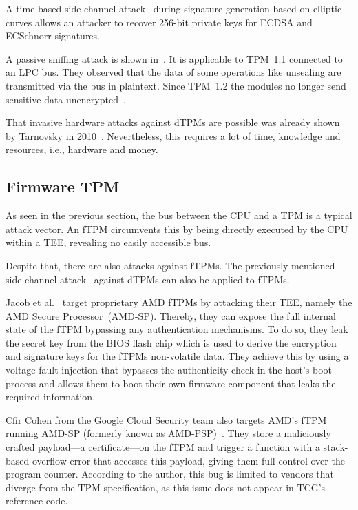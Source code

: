 A time-based side-channel attack~\cite{Moghimi2019} during signature generation based on elliptic curves allows an attacker to recover 256-bit private keys for ECDSA and ECSchnorr signatures.

A passive sniffing attack is shown in~\cite{Kursawe2005AnalyzingTP}.
It is applicable to TPM~1.1 connected to an LPC bus.
They observed that the data of some operations like unsealing are transmitted via the bus in plaintext.
Since TPM~1.2 the modules no longer send sensitive data unencrypted~\cite{Winter2013}.

That invasive hardware attacks against \acp{dTPM} are possible was already shown by Tarnovsky in 2010~\cite{tarnovsky}.
Nevertheless, this requires a lot of time, knowledge and resources, i.e., hardware and money.

\subsection{Firmware TPM}

As seen in the previous section, the bus between the CPU and a TPM is a typical attack vector.
An \ac{fTPM} circumvents this by being directly executed by the CPU within a \ac{TEE}, revealing no easily accessible bus.

Despite that, there are also attacks against \acp{fTPM}.
The previously mentioned side-channel attack~\cite{Moghimi2019} against \acp{dTPM} can also be applied to \acp{fTPM}.

Jacob et al.~\cite{Jacob2023} target proprietary AMD fTPMs by attacking their \ac{TEE}, namely the AMD Secure Processor~(AMD-SP).
Thereby, they can expose the full internal state of the \ac{fTPM} bypassing any authentication mechanisms.
To do so, they leak the secret key from the BIOS flash chip which is used to derive the encryption and signature keys for the \acp{fTPM} non-volatile data.
They achieve this by using a voltage fault injection that bypasses the authenticity check in the host's boot process and allows them to boot their own firmware component that leaks the required information.

Cfir Cohen from the Google Cloud Security team also targets AMD's fTPM running AMD-SP (formerly known as AMD-PSP)~\cite{cohen}.
They store a maliciously crafted payload---a certificate---on the \ac{fTPM} and trigger a function with a stack-based overflow error that accesses this payload, giving them full control over the program counter.
According to the author, this bug is limited to vendors that diverge from the \ac{TPM} specification, as this issue does not appear in \ac{TCG}'s reference code.

